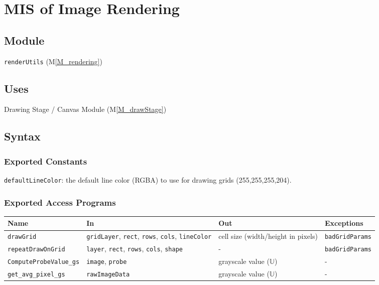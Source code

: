 \documentclass[12pt, titlepage]{article}
\newcommand{\mref}[1]{M\ref{#1}}
\newcommand{\mrefp}[1]{(\mref{#1})}
\newcommand{\mreff}[1]{Module \mrefp{#1}}
\newcommand{\code}[1]{\texttt{#1}}
\begin{document}
\newpage



\section{MIS of Image Rendering} \label{MS_rendering}

\subsection{Module}
\code{renderUtils} \mrefp{M_rendering}

\subsection{Uses}
Drawing Stage / Canvas \mreff{M_drawStage}

\subsection{Syntax}

\subsubsection{Exported Constants}
\code{defaultLineColor}: the default line color (RGBA) to use for drawing grids (255,255,255,204).

\subsubsection{Exported Access Programs}

\begin{center}
\begin{tabular}{p{4cm} p{4cm} p{4cm} p{3cm}}
\hline
\textbf{Name} & \textbf{In} & \textbf{Out} & \textbf{Exceptions} \\
\hline
\code{drawGrid} & \code{gridLayer}, \code{rect}, \code{rows}, \code{cols}, \code{lineColor}
  & cell size (width/height in pixels) & \code{badGridParams} \\
\hline
\code{repeatDrawOnGrid} & \code{layer}, \code{rect}, \code{rows}, \code{cols}, \code{shape}
  & - & \code{badGridParams} \\
\hline
\code{ComputeProbeValue\_gs} & \code{image}, \code{probe} & grayscale value ($\mathbb{U}$) & - \\
\hline
\code{get\_avg\_pixel\_gs} & \code{rawImageData} & grayscale value ($\mathbb{U}$) & - \\
\hline
\end{tabular}
\end{center}
\end{document}
